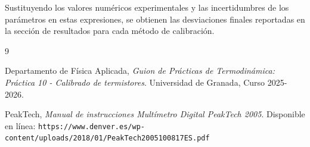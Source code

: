 \documentclass[11pt,a4paper]{article}
\begin{document}
Sustituyendo los valores numéricos experimentales y las incertidumbres de los parámetros en estas expresiones, se obtienen las desviaciones finales reportadas en la sección de resultados para cada método de calibración.


\begin{thebibliography}{9}

Departamento de Física Aplicada, \emph{Guion de Prácticas de Termodinámica: Práctica 10 - Calibrado de termistores}. Universidad de Granada, Curso 2025-2026.

PeakTech, \emph{Manual de instrucciones Multímetro Digital PeakTech 2005}. Disponible en línea: \texttt{https://www.denver.es/wp-content/uploads/2018/01/PeakTech2005100817ES.pdf}

\end{thebibliography}
\end{document}
